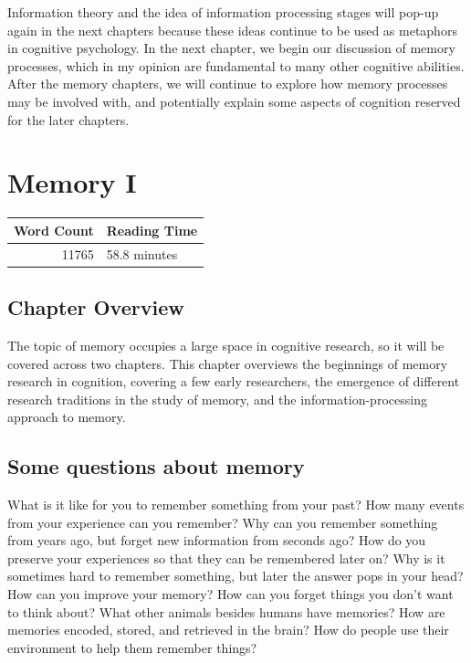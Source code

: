 \documentclass[
  oneside,
  12pt]{crumpbook}
\begin{document}
Information theory and the idea of information processing stages will pop-up again in the next chapters because these ideas continue to be used as metaphors in cognitive psychology. In the next chapter, we begin our discussion of memory processes, which in my opinion are fundamental to many other cognitive abilities. After the memory chapters, we will continue to explore how memory processes may be involved with, and potentially explain some aspects of cognition reserved for the later chapters.

\hypertarget{memory-i}{%
\chapter{Memory I}\label{memory-i}}

\begin{tabular}{r|l}
\hline
Word Count & Reading Time\\
\hline
11765 & 58.8 minutes\\
\hline
\end{tabular}

\hypertarget{chapter-overview-5}{%
\section{Chapter Overview}\label{chapter-overview-5}}

The topic of memory occupies a large space in cognitive research, so it will be covered across two chapters. This chapter overviews the beginnings of memory research in cognition, covering a few early researchers, the emergence of different research traditions in the study of memory, and the information-processing approach to memory.

\hypertarget{some-questions-about-memory}{%
\section{Some questions about memory}\label{some-questions-about-memory}}

What is it like for you to remember something from your past? How many events from your experience can you remember? Why can you remember something from years ago, but forget new information from seconds ago? How do you preserve your experiences so that they can be remembered later on? Why is it sometimes hard to remember something, but later the answer pops in your head? How can you improve your memory? How can you forget things you don't want to think about? What other animals besides humans have memories? How are memories encoded, stored, and retrieved in the brain? How do people use their environment to help them remember things?
\end{document}

